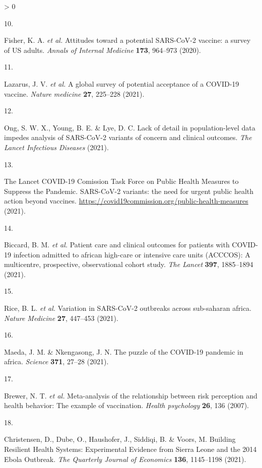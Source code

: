 \documentclass[
  12pt,
]{article}
\newlength{\cslhangindent}
\newlength{\csllabelwidth}
\newenvironment{CSLReferences}[2] %
 {%
  \setlength{\parindent}{0pt}
  \ifodd #1 \everypar{\setlength{\hangindent}{\cslhangindent}}\ignorespaces\fi
  \ifnum #2 > 0
  \setlength{\parskip}{#2\baselineskip}
  \fi
 }%
 {}
\newcommand{\CSLLeftMargin}[1]{\parbox[t]{\csllabelwidth}{#1}}
\newcommand{\CSLRightInline}[1]{\parbox[t]{\linewidth - \csllabelwidth}{#1}\break}
\begin{document}
\begin{CSLReferences}{0}{0}
\leavevmode\hypertarget{ref-fisher2020attitudes}{}%
\CSLLeftMargin{10. }
\CSLRightInline{Fisher, K. A. \emph{et al.} {Attitudes toward a potential SARS-CoV-2 vaccine: a survey of US adults}. \emph{{Annals of Internal Medicine}} \textbf{173}, 964--973 (2020).}

\leavevmode\hypertarget{ref-lazarus2020nature}{}%
\CSLLeftMargin{11. }
\CSLRightInline{Lazarus, J. V. \emph{et al.} {A global survey of potential acceptance of a COVID-19 vaccine}. \emph{Nature medicine} \textbf{27}, 225--228 (2021).}

\leavevmode\hypertarget{ref-ong2021lack}{}%
\CSLLeftMargin{12. }
\CSLRightInline{Ong, S. W. X., Young, B. E. \& Lye, D. C. {Lack of detail in population-level data impedes analysis of SARS-CoV-2 variants of concern and clinical outcomes}. \emph{The Lancet Infectious Diseases} (2021).}

\leavevmode\hypertarget{ref-lancettask}{}%
\CSLLeftMargin{13. }
\CSLRightInline{The Lancet COVID-19 Comission Task Force on Public Health Measures to Suppress the Pandemic. {SARS-CoV-2 variants: the need for urgent public health action beyond vaccines}. \url{https://covid19commission.org/public-health-measures} (2021).}

\leavevmode\hypertarget{ref-biccard2021patient}{}%
\CSLLeftMargin{14. }
\CSLRightInline{Biccard, B. M. \emph{et al.} Patient care and clinical outcomes for patients with COVID-19 infection admitted to african high-care or intensive care units (ACCCOS): A multicentre, prospective, observational cohort study. \emph{The Lancet} \textbf{397}, 1885--1894 (2021).}

\leavevmode\hypertarget{ref-rice2021variation}{}%
\CSLLeftMargin{15. }
\CSLRightInline{Rice, B. L. \emph{et al.} Variation in SARS-CoV-2 outbreaks across sub-saharan africa. \emph{Nature Medicine} \textbf{27}, 447--453 (2021).}

\leavevmode\hypertarget{ref-maeda2021puzzle}{}%
\CSLLeftMargin{16. }
\CSLRightInline{Maeda, J. M. \& Nkengasong, J. N. The puzzle of the COVID-19 pandemic in africa. \emph{Science} \textbf{371}, 27--28 (2021).}

\leavevmode\hypertarget{ref-brewer2007meta}{}%
\CSLLeftMargin{17. }
\CSLRightInline{Brewer, N. T. \emph{et al.} Meta-analysis of the relationship between risk perception and health behavior: The example of vaccination. \emph{Health psychology} \textbf{26}, 136 (2007).}

\leavevmode\hypertarget{ref-christensen2020building}{}%
\CSLLeftMargin{18. }
\CSLRightInline{Christensen, D., Dube, O., Haushofer, J., Siddiqi, B. \& Voors, M. {Building Resilient Health Systems: Experimental Evidence from Sierra Leone and the 2014 Ebola Outbreak}. \emph{The Quarterly Journal of Economics} \textbf{136}, 1145--1198 (2021).}


\end{CSLReferences}
\end{document}

